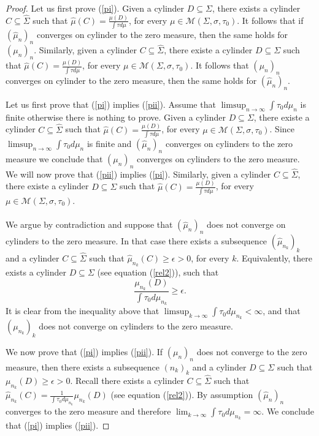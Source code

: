 \documentclass[letterpaper,11pt]{amsart}
\theoremstyle{plain}
\theoremstyle{plain}
\theoremstyle{definition}
\theoremstyle{remark}
\def\e{\epsilon}
\def\M{{\mathcal M}}
\begin{document}
\iffalse
\begin{proof} Let us first prove (\ref{pi}). Given a cylinder $D\subseteq \Sigma$, there exists a cylinder $C\subseteq \widehat{\Sigma}$ such that $\hat{\mu}(C)=\frac{\mu(D)}{\int \tau d\mu}$, for every $\mu\in\M(\Sigma,\sigma,\tau_0)$. It follows that if $(\hat{\mu}_n)_n$ converges on cylinder to the zero measure, then the same holds for $(\mu_n)_n$. Similarly, given a cylinder $C\subseteq \widehat{\Sigma}$, there existe a cylinder $D\subseteq \Sigma$  such that $\hat{\mu}(C)=\frac{\mu(D)}{\int \tau d\mu}$, for every $\mu\in\M(\Sigma,\sigma,\tau_0)$. It follows that $(\mu_n)_n$  converges on cylinder to the zero measure, then the same holds for $(\hat{\mu}_n)_n$.

Let us first prove that (\ref{pi}) implies (\ref{pii}). Assume that $\limsup_{n\to\infty}\int {\tau_0} d\mu_{n}$ is finite otherwise there is nothing to prove. Given a cylinder $D\subseteq \Sigma$, there existe a cylinder $C\subseteq \widehat{\Sigma}$ such that $\hat{\mu}(C)=\frac{\mu(D)}{\int \tau d\mu}$, for every $\mu\in\M(\Sigma,\sigma,\tau_0)$. Since  $\limsup_{n\to\infty}\int {\tau_0} d\mu_{n}$ is finite and $(\hat{\mu}_n)_n$  converges on cylinders to the zero measure we conclude that  $(\mu_n)_n$ converges on cylinders to the zero measure.\\
We will now prove that (\ref{pii}) implies (\ref{pi}). Similarly, given a cylinder $C\subseteq \widehat{\Sigma}$, there existe a cylinder $D\subseteq \Sigma$  such that $\hat{\mu}(C)=\frac{\mu(D)}{\int \tau d\mu}$, for every $\mu\in\M(\Sigma,\sigma,\tau_0)$.\\\\
We argue by contradiction and suppose that $(\hat{\mu}_n)_n$ does not converge on cylinders to the zero measure. In that case there exists a subsequence $(\hat{\mu}_{n_k})_k$ and a cylinder $C\subseteq \widehat{\Sigma}$ such that $\hat{\mu}_{n_k}(C)\ge \e>0$, for every $k$. Equivalently, there exists a cylinder $D\subseteq \Sigma$ (see equation (\ref{rel2})), such that  
$$\frac{\mu_{n_k}(D)}{\int {\tau_0} d\mu_{n_k}}\ge \e .$$
It is clear from the inequality above that $\limsup_{k\to\infty}\int {\tau_0} d\mu_{n_k}<\infty$, and that $(\mu_{n_k})_k$ does not converge on cylinders to the zero measure. 

We now prove that (\ref{pi}) implies (\ref{pii}).  If $(\mu_n)_n$ does not converge to the zero measure, then there exists a subsequence $(n_k)_k$ and a cylinder $D\subseteq \Sigma$ such that $\mu_{n_k}(D)\ge \e>0$. Recall there exists a cylinder $C\subseteq \widehat{\Sigma}$ such that $\hat{\mu}_{n_k}(C)=\frac{1}{\int{\tau_0} d\mu_{n_k}}\mu_{n_k}(D)$ (see equation (\ref{rel2})). By assumption $(\hat{\mu}_n)_n$ converges to the zero measure and therefore $\lim_{k\to\infty}\int {\tau_0} d\mu_{n_k}=\infty$. We conclude that (\ref{pi}) implies (\ref{pii}).
\end{proof}
\end{document}
